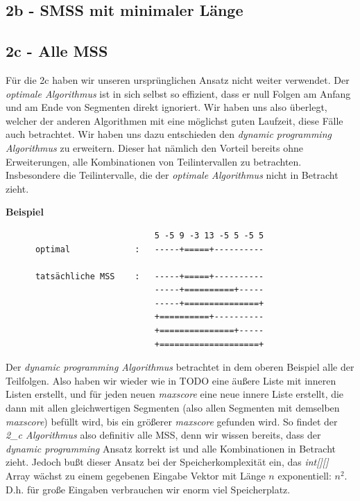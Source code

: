 \documentclass[10pt]{article}
\begin{document}
\subsection{2b - SMSS mit minimaler Länge}\label{2b}
\lipsum[1]
\subsection{2c - Alle MSS} 

Für die 2c haben wir unseren ursprünglichen Ansatz nicht weiter verwendet. Der \textit{optimale Algorithmus} ist in sich selbst so effizient,
dass er null Folgen am Anfang und am Ende von Segmenten direkt ignoriert. Wir haben uns also überlegt, welcher der anderen 
Algorithmen mit eine möglichst guten Laufzeit, diese Fälle auch betrachtet. Wir haben uns dazu entschieden den \textit{dynamic programming Algorithmus} zu erweitern. Dieser hat nämlich den Vorteil
bereits ohne Erweiterungen, alle Kombinationen von Teilintervallen zu betrachten. Insbesondere die Teilintervalle,
die der \textit{optimale Algorithmus} nicht in Betracht zieht.

\textbf{Beispiel}

\begin{verbatim}
                              5 -5 9 -3 13 -5 5 -5 5
      optimal             :   -----+=====+----------

      tatsächliche MSS    :   -----+=====+----------
                              -----+==========+-----
                              -----+===============+
                              +==========+----------
                              +===============+-----
                              +====================+
\end{verbatim}

\newpage
Der \textit{dynamic programming Algorithmus} betrachtet in dem oberen Beispiel alle der Teilfolgen. 
Also haben wir wieder wie in TODO eine äu\ss ere Liste mit inneren Listen erstellt, und für jeden neuen \textit{maxscore} eine neue innere Liste
erstellt, die dann mit allen gleichwertigen Segmenten (also allen Segmenten mit demselben \textit{maxscore}) befüllt wird, bis ein grö\ss erer \textit{maxscore} gefunden wird.
So findet der \textit{2\_c Algorithmus} also definitiv alle MSS, denn wir wissen bereits, dass der \textit{dynamic programming} Ansatz korrekt ist und
alle Kombinationen in Betracht zieht. Jedoch bu\ss t dieser Ansatz bei der Speicherkomplexität ein, das \textit{int[][]} Array wächst 
zu einem gegebenen Eingabe Vektor mit Länge $n$ exponentiell: $n^{2}$. D.h. für gro\ss e Eingaben verbrauchen wir enorm viel
Speicherplatz. 
\end{document}
